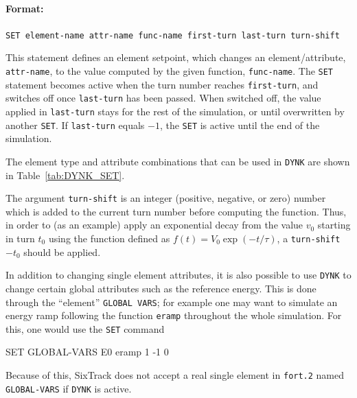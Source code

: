 \paragraph{Format:} \texttt{SET element-name attr-name func-name first-turn last-turn turn-shift}

\bigskip
This statement defines an element setpoint, which changes an element/attribute, \texttt{attr-name}, to the value computed by the given function, \texttt{func-name}.
The \texttt{SET} statement becomes active when the turn number reaches \texttt{first-turn}, and switches off once \texttt{last-turn} has been passed.
When switched off, the value applied in \texttt{last-turn} stays for the rest of the simulation, or until overwritten by another \texttt{SET}.
If \texttt{last-turn} equals $-1$, the \texttt{SET} is active until the end of the simulation.

The element type and attribute combinations that can be used in \texttt{DYNK} are shown in Table~\ref{tab:DYNK_SET}.

The argument \texttt{turn-shift} is an integer (positive, negative, or zero) number which is added to the current turn number before computing the function.
Thus, in order to (as an example) apply an exponential decay from the value $v_0$ starting in turn $t_0$ using the function defined as $f(t) = V_0 \exp(-t/\tau)$, a \texttt{turn-shift} $-t_0$ should be applied.

In addition to changing single element attributes, it is also possible to use \texttt{DYNK} to change certain global attributes such as the reference energy.
This is done through the ``element'' \texttt{GLOBAL VARS}; for example one may want to simulate an energy ramp following the function \texttt{eramp} throughout the whole simulation.
For this, one would use the \texttt{SET} command
\begin{cverbatim}
SET GLOBAL-VARS E0 eramp 1 -1 0
\end{cverbatim}
Because of this, SixTrack does not accept a real single element in \texttt{fort.2} named \texttt{GLOBAL-VARS} if \texttt{DYNK} is active.

